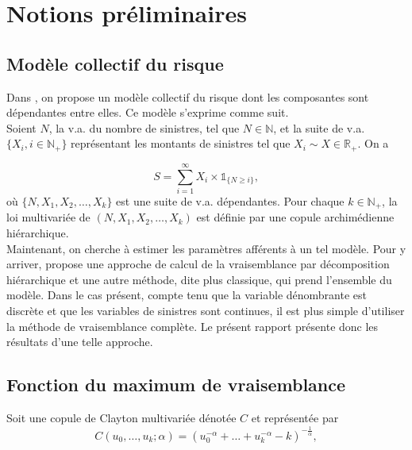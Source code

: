 \documentclass{article}
\begin{document}
	\section{Notions préliminaires}
	\subsection{Modèle collectif du risque}\label{sect_Modele_Collectif}
	
		Dans \cite{Itre5}, on propose un modèle collectif du risque dont les composantes sont dépendantes entre elles. Ce modèle s'exprime comme suit. \\
		
		Soient $N$, la v.a. du nombre de sinistres, tel que $N \in \mathbb{N}$, et la suite de v.a. $\{X_i, i \in \mathbb{N_+}\}$ représentant les montants de sinistres tel que $X_i\sim X \in \mathbb{R}_+$. On a
		
		\begin{equation}\label{Modele_collectif}
			S = \sum_{i=1}^{\infty} X_i \times \mathds{1}_{\{N \geq i\}},
		\end{equation}
		où $\{N, X_1, X_2, \dots, X_k\}$ est une suite de v.a. dépendantes. Pour chaque $k \in \mathbb{N_+}$, la loi multivariée de $(N, X_1, X_2, \dots, X_k)$ est définie par une copule archimédienne hiérarchique. \\
		
		Maintenant, on cherche à estimer les paramètres afférents à un tel modèle. Pour y arriver, \cite{LikelyhoodEstimation} propose une approche de calcul de la vraisemblance par décomposition hiérarchique et une autre méthode, dite plus classique, qui prend l'ensemble du modèle. Dans le cas présent, compte tenu que la variable dénombrante est discrète et que les variables de sinistres sont continues, il est plus simple d'utiliser la méthode de vraisemblance complète. Le présent rapport présente donc les résultats d'une telle approche.
				
	
	\subsection{Fonction du maximum de vraisemblance} \label{sect_Maxlikelyhood}
	
		Soit une copule de Clayton multivariée dénotée $C$ et représentée par
		\begin{equation}\label{Copule_Clayton}
		C(u_0,\dots,u_k;\alpha) = (  u_0^{-\alpha} + \dots + u_k^{-\alpha} - k)^{-\frac{1}{\alpha}},
		\end{equation}
	
\end{document}
